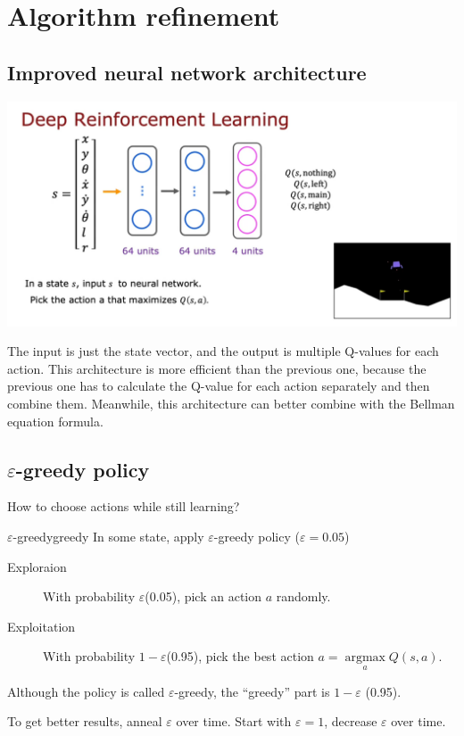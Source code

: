 \section{Algorithm refinement}
\subsection*{Improved neural network architecture}
\noindent
\includegraphics*[width=\textwidth]{images/19.4}

The input is just the state vector, and the output is multiple Q-values for each action.
This architecture is more efficient than the previous one, because the previous one has to calculate the Q-value for each action separately and
then combine them. Meanwhile, this architecture can better combine with the Bellman equation formula.

\subsection*{$\varepsilon$-greedy policy}
How to choose actions while still learning?
\begin{thmbox}{$\varepsilon$-greedy}{greedy}
    In some state, apply $\varepsilon$-greedy policy ($\varepsilon = 0.05$)
    \begin{description}
        \item[Exploraion] With probability $\varepsilon$(0.05), pick an action $a$ randomly.
        \item[Exploitation] With probability $1-\varepsilon$(0.95), pick the best action $a = \mathop{\mathrm{argmax}} \limits_{a} Q(s,a)$.  
    \end{description}
    Although the policy is called $\varepsilon$-greedy, the ``greedy'' part is $1-\varepsilon$ (0.95).

    To get better results, anneal $\varepsilon$ over time. Start with $\varepsilon = 1$, decrease $\varepsilon$ over time.
\end{thmbox}

